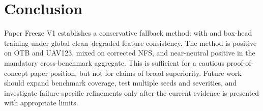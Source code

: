 \section{Conclusion}

Paper Freeze V1 establishes a conservative fallback method: \baseline{} with \method{} and box-head training under global clean--degraded feature consistency. The method is positive on OTB and UAV123, mixed on corrected NFS, and near-neutral positive in the mandatory cross-benchmark aggregate. This is sufficient for a cautious proof-of-concept paper position, but not for claims of broad superiority. Future work should expand benchmark coverage, test multiple seeds and severities, and investigate failure-specific refinements only after the current evidence is presented with appropriate limits.
